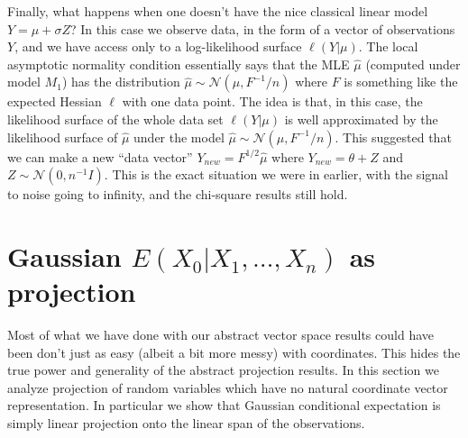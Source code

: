 \documentclass[11pt]{report}
\begin{document}
Finally, what happens when one doesn't have the nice classical linear model $Y = \mu + \sigma Z$? In this case we observe data, in the form of a vector of observations $Y$, and we have access only to a log-likelihood surface $\ell(Y|\mu)$. The local asymptotic normality condition essentially says that the MLE $\hat\mu$ (computed under model $M_1$) has the distribution $\hat\mu \sim \mathcal N(\mu, F^{-1}/n)$ where $F$ is something like the expected Hessian $\ell$ with one data point. The idea is that, in this case, the likelihood surface of the whole data set $\ell(Y|\mu)$ is well approximated by the likelihood surface of $\hat\mu$ under the model $\hat\mu \sim \mathcal N(\mu, F^{-1}/n)$. This suggested that we can make a new ``data vector'' $Y_{new} = F^{1/2}\hat\mu$ where $Y_{new}= \theta + Z$ and $Z\sim \mathcal N(0, n^{-1}I)$. This is the exact situation we were in earlier, with the signal to noise going to infinity, and the chi-square results still hold.

\section{Gaussian $E(X_0|X_1,\ldots, X_n)$ as projection}


Most of what we have done with our abstract vector space results could have been don't just as easy (albeit a bit more messy) with coordinates. This hides the true power and generality of the abstract projection results. In this section we analyze projection of random variables which have no natural coordinate vector representation. In particular we show that Gaussian conditional expectation is simply linear projection onto the linear span of the observations. 
\end{document}
